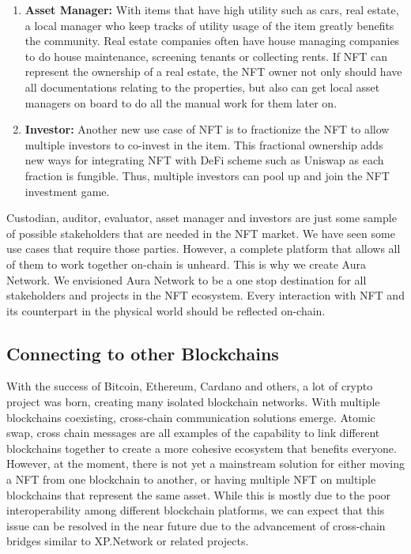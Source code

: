 \documentclass[12pt]{article}
\begin{document}
\begin{enumerate}
    \item \textbf{Asset Manager:} With items that have high utility such as cars, real estate, a local manager who keep tracks of utility usage of the item greatly benefits the community. Real estate companies often have house managing companies to do house maintenance, screening tenants or collecting rents. If NFT can represent the ownership of a real estate, the NFT owner not only should have all documentations relating to the properties, but also can get local asset managers on board to do all the manual work for them later on. 
    
    \item \textbf{Investor:} Another new use case of NFT is to fractionize the NFT to allow multiple investors to co-invest in the item. This fractional ownership adds new ways for integrating NFT with DeFi scheme such as Uniswap as each fraction is fungible. Thus, multiple investors can pool up and join the NFT investment game.
\end{enumerate}

Custodian, auditor, evaluator, asset manager and investors are just some sample of possible stakeholders that are needed in the NFT market. We have seen some use cases that require those parties. However, a complete platform that allows all of them to work together on-chain is unheard. This is why we create Aura Network. We envisioned Aura Network to be a one stop destination for all stakeholders and projects in the NFT ecosystem. Every interaction with NFT and its counterpart in the physical world should be reflected on-chain.

\subsection{Connecting to other Blockchains}

With the success of Bitcoin, Ethereum, Cardano and others, a lot of crypto project was born, creating many isolated blockchain networks. With multiple blockchains coexisting, cross-chain communication solutions emerge. Atomic swap, cross chain messages are all examples of the capability to link different blockchains together to create a more cohesive ecosystem that benefits everyone. However, at the moment, there is not yet a mainstream solution for either moving a NFT from one blockchain to another, or having multiple NFT on multiple blockchains that represent the same asset. While this is mostly due to the poor interoperability among different blockchain platforms, we can expect that this issue can be resolved in the near future due to the advancement of cross-chain bridges similar to XP.Network \cite{xpnetwork} or related projects. 
\end{document}
